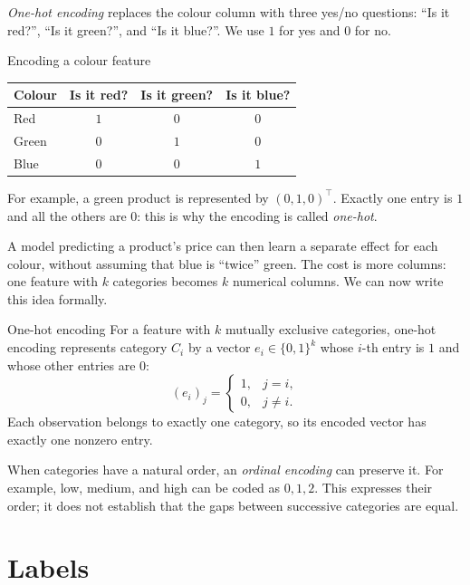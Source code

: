 \documentclass[a4paper,12pt,oneside]{report}
\begin{document}
\emph{One-hot encoding} replaces the colour column with three yes/no
questions: ``Is it red?'', ``Is it green?'', and ``Is it blue?''.
We use $1$ for yes and $0$ for no.

\begin{framedexample}{Encoding a colour feature}
\begin{center}
\begin{tabular}{@{}lccc@{}}
\toprule
\textbf{Colour} & \textbf{Is it red?} & \textbf{Is it green?} & \textbf{Is it blue?} \\
\midrule
Red   & $1$ & $0$ & $0$ \\
Green & $0$ & $1$ & $0$ \\
Blue  & $0$ & $0$ & $1$ \\
\bottomrule
\end{tabular}
\end{center}
For example, a green product is represented by $(0,1,0)^\top$.
Exactly one entry is $1$ and all the others are $0$: this is why the
encoding is called \emph{one-hot}.
\end{framedexample}

A model predicting a product's price can then learn a separate effect
for each colour, without assuming that blue is ``twice'' green.
The cost is more columns: one feature with $k$ categories becomes $k$
numerical columns. We can now write this idea formally.

\begin{frameddefn}{One-hot encoding}\label{def:one-hot}
For a feature with $k$ mutually exclusive categories, one-hot encoding
represents category $C_i$ by a vector $e_i\in\{0,1\}^{k}$ whose $i$-th
entry is $1$ and whose other entries are $0$:
\[
  (e_i)_j=\begin{cases}
    1,&j=i,\\
    0,&j\neq i.
  \end{cases}
\]
Each observation belongs to exactly one category, so its encoded vector
has exactly one nonzero entry.
\end{frameddefn}

When categories have a natural order, an \emph{ordinal encoding} can
preserve it. For example, low, medium, and high can be coded as $0,1,2$.
This expresses their order; it does not establish that the gaps between
successive categories are equal.

\section{Labels}
\end{document}
